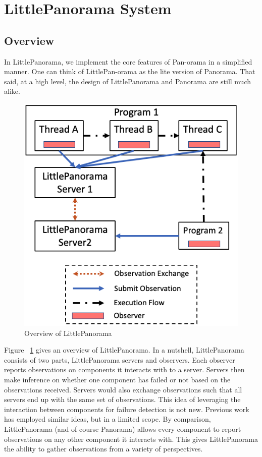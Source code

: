 \section{LittlePanorama System}
\subsection{Overview}
In LittlePanorama, we implement the core features of Pan-orama in a simplified manner. One can think of LittlePan-orama as the lite version of Panorama. That said, at a high level, the design of LittlePanorama and Panorama are still much alike. 

\begin{figure}[!tb]
\centering
\includegraphics[width=\columnwidth]{figs/overview.png}
\vspace{-1em}
\caption{Overview of LittlePanorama
\label{fig:overview}
}
\end{figure}

Figure ~\ref{fig:overview} gives an overview of LittlePanorama. In a nutshell, LittlePanorama consists of two parts, LittlePanorama servers and observers. Each observer reports observations on components it interacts with to a server. Servers then make inference on whether one component has failed or not based on the observations received. Servers would also exchange observations such that all servers end up with the same set of observations. This idea of leveraging the interaction between components for failure detection is not new. Previous work ~\cite{van1998gossip} has employed similar ideas, but in a limited scope. By comparison, LittlePanorama (and of course Panorama) allows every component to report observations on any other component it interacts with. This gives LittlePanorama the ability to gather observations from a variety of perspectives. 

